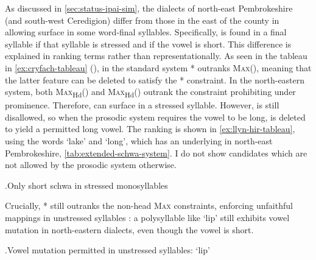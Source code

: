 As discussed in \cref{sec:status-ipai-sim}, the dialects of north-east Pembrokeshire (and south-west Ceredigion) differ from those in the east of the county in allowing surface \ipa{[ə]} in some word-final syllables. Specifically, \ipa{[ə]} is found in a final syllable if that syllable is stressed and if the vowel is short. This difference is explained in ranking terms rather than representationally. As seen in the tableau in \ref{ex:cryfach-tableau} (), in the standard system *\ipa{[ə́]} outranks \textsc{Max}(), meaning that the latter feature can be deleted to satisfy the *\ipa{[ə́]} constraint. In the north-eastern system, both \textsc{Max}\textsubscript{Hd}() and \textsc{Max}\textsubscript{Hd}() outrank the constraint prohibiting \ipa{[ə]} under prominence. Therefore, \ipa{[ə]} can surface in a stressed syllable. However, \ipa{[əː]} is still disallowed, so when the prosodic system requires the vowel to be long,  is deleted to yield a permitted long vowel. The ranking is shown in \ref{ex:llyn-hir-tableau}, using the words \ipa{[ˈɬən]} `lake' and \ipa{[ˈhiːr]} `long', which has an underlying  in north-east Pembrokeshire, \cf \cref{tab:extended-schwa-system}. I do not show candidates which are not allowed by the prosodic system otherwise.

\ex.\label{ex:llyn-hir-tableau}Only short schwa in stressed monosyllables\\
\begin{OTmultitableau}{4}
\OTmcandrow{[ˈɬín]}{,,*!,}
\OTmcandrow{[ˈɬón]}{,*!,,}
\OTmcandrow[/hər/]{[ˈhə́ːr]}{*!,,,*}
\OTmcandrow[][\OThand]{[ˈhíːr]}{,,*,}
\OTmcandrow{[ˈhóːr]}{,*!,,}
\end{OTmultitableau}

Crucially, *\ipa{[ə́]} still outranks the non\hyp head \textsc{Max} constraints, enforcing unfaithful mappings in unstressed syllables \citep[\egm][]{beckman,alderete1999}: a polysyllable like  `lip' still exhibits vowel mutation in north-eastern dialects, even though the vowel is short.

\ex.Vowel mutation permitted in unstressed syllables:  `lip'\\
\begin{OTmultitableau}{4}
\OTmcandrow[/ɡwevəs/]{[ˈɡweːvə́s]}{,*!,,}
\OTmcandrow[][\OThand]{[ˈɡweːvís]}{,,,*}
\OTmcandrow{[ˈɡweːvós]}{,,*!,}
\OTmcandrow[/ɡwevəse/][\OThand]{[ɡweˈvəsé]}{,,,}
\OTmcandrow{[ɡweˈvisé]}{*!,,,*}
\OTmcandrow{[ɡweˈvosé]}{*!,,*,}
\end{OTmultitableau}


